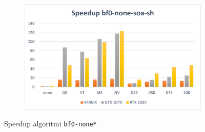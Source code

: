 \documentclass[12pt,a4paper]{book}
\begin{document}
\begin{figure}[b]
\begin{subfigure}{.5\textwidth}
		\end{subfigure}%
		\begin{subfigure}{.5\textwidth}
			\centering
			\includegraphics[width=\textwidth]{speedup_bf0-none-soa-sh}
		\end{subfigure}
		\caption{Speedup algoritmi \texttt{bf0-none*}}
		\label{fig:speedup_bf0-none}
	\end{figure}
\end{document}
